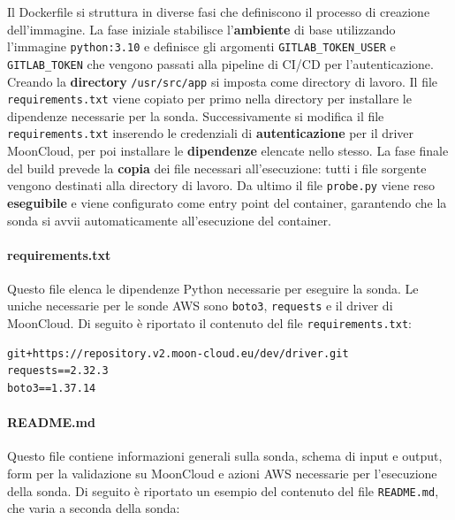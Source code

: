 Il Dockerfile si struttura in diverse fasi che definiscono il processo di creazione dell'immagine. La fase iniziale stabilisce l'\textbf{ambiente} di base utilizzando l'immagine \texttt{python:3.10} e definisce gli argomenti \texttt{GITLAB\_TOKEN\_USER} e \texttt{GITLAB\_TOKEN} che vengono passati alla pipeline di CI/CD per l'autenticazione.
Creando la \textbf{directory} \texttt{/usr/src/app} si imposta come directory di lavoro. Il file \texttt{requirements.txt} viene copiato per primo nella directory per installare le dipendenze necessarie per la sonda.
Successivamente si modifica il file \texttt{requirements.txt} inserendo le credenziali di \textbf{autenticazione} per il driver MoonCloud, per poi installare le \textbf{dipendenze} elencate nello stesso.
La fase finale del build prevede la \textbf{copia} dei file necessari all'esecuzione: tutti i file sorgente vengono destinati alla directory di lavoro. Da ultimo il file \texttt{probe.py} viene reso \textbf{eseguibile} e viene configurato come entry point del container, garantendo che la sonda si avvii automaticamente all'esecuzione del container.

\paragraph{requirements.txt} Questo file elenca le dipendenze Python necessarie per eseguire la sonda. Le uniche necessarie per le sonde AWS sono \texttt{boto3}, \texttt{requests} e il driver di MoonCloud. Di seguito è riportato il contenuto del file \texttt{requirements.txt}:

\begin{lstlisting}[caption ={File \texttt{requirements.txt} per le dipendenze della sonda}]
git+https://repository.v2.moon-cloud.eu/dev/driver.git
requests==2.32.3
boto3==1.37.14
\end{lstlisting}

\paragraph{README.md} Questo file contiene informazioni generali sulla sonda, schema di input e output, form per la validazione su MoonCloud e azioni AWS necessarie per l'esecuzione della sonda. Di seguito è riportato un esempio del contenuto del file \texttt{README.md}, che varia a seconda della sonda:

